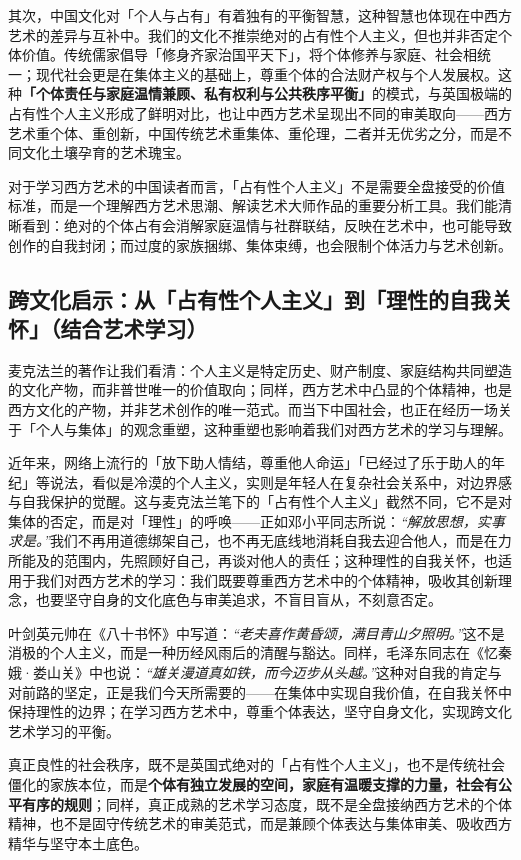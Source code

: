 \documentclass[12pt,a4paper]{article}
\begin{document}
其次，中国文化对「个人与占有」有着独有的平衡智慧，这种智慧也体现在中西方艺术的差异与互补中。我们的文化不推崇绝对的占有性个人主义，但也并非否定个体价值。传统儒家倡导「修身齐家治国平天下」，将个体修养与家庭、社会相统一；现代社会更是在集体主义的基础上，尊重个体的合法财产权与个人发展权。这种\textbf{「个体责任与家庭温情兼顾、私有权利与公共秩序平衡」}的模式，与英国极端的占有性个人主义形成了鲜明对比，也让中西方艺术呈现出不同的审美取向——西方艺术重个体、重创新，中国传统艺术重集体、重伦理，二者并无优劣之分，而是不同文化土壤孕育的艺术瑰宝。

对于学习西方艺术的中国读者而言，「占有性个人主义」不是需要全盘接受的价值标准，而是一个理解西方艺术思潮、解读艺术大师作品的重要分析工具。我们能清晰看到：绝对的个体占有会消解家庭温情与社群联结，反映在艺术中，也可能导致创作的自我封闭；而过度的家族捆绑、集体束缚，也会限制个体活力与艺术创新。

\subsection*{跨文化启示：从「占有性个人主义」到「理性的自我关怀」（结合艺术学习）}
麦克法兰的著作让我们看清：个人主义是特定历史、财产制度、家庭结构共同塑造的文化产物，而非普世唯一的价值取向；同样，西方艺术中凸显的个体精神，也是西方文化的产物，并非艺术创作的唯一范式。而当下中国社会，也正在经历一场关于「个人与集体」的观念重塑，这种重塑也影响着我们对西方艺术的学习与理解。

近年来，网络上流行的「放下助人情结，尊重他人命运」「已经过了乐于助人的年纪」等说法，看似是冷漠的个人主义，实则是年轻人在复杂社会关系中，对边界感与自我保护的觉醒。这与麦克法兰笔下的「占有性个人主义」截然不同，它不是对集体的否定，而是对「理性」的呼唤——正如邓小平同志所说：\textit{“解放思想，实事求是。”}我们不再用道德绑架自己，也不再无底线地消耗自我去迎合他人，而是在力所能及的范围内，先照顾好自己，再谈对他人的责任；这种理性的自我关怀，也适用于我们对西方艺术的学习：我们既要尊重西方艺术中的个体精神，吸收其创新理念，也要坚守自身的文化底色与审美追求，不盲目盲从，不刻意否定。

叶剑英元帅在《八十书怀》中写道：\textit{“老夫喜作黄昏颂，满目青山夕照明。”}这不是消极的个人主义，而是一种历经风雨后的清醒与豁达。同样，毛泽东同志在《忆秦娥·娄山关》中也说：\textit{“雄关漫道真如铁，而今迈步从头越。”}这种对自我的肯定与对前路的坚定，正是我们今天所需要的——在集体中实现自我价值，在自我关怀中保持理性的边界；在学习西方艺术中，尊重个体表达，坚守自身文化，实现跨文化艺术学习的平衡。

真正良性的社会秩序，既不是英国式绝对的「占有性个人主义」，也不是传统社会僵化的家族本位，而是\textbf{个体有独立发展的空间，家庭有温暖支撑的力量，社会有公平有序的规则}；同样，真正成熟的艺术学习态度，既不是全盘接纳西方艺术的个体精神，也不是固守传统艺术的审美范式，而是兼顾个体表达与集体审美、吸收西方精华与坚守本土底色。
\end{document}

